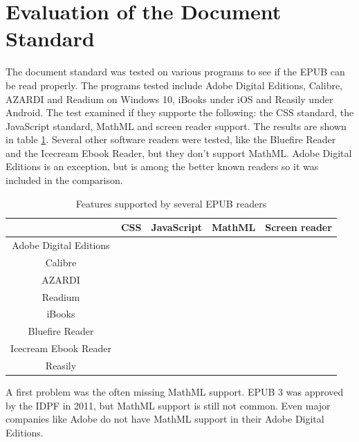 \documentclass[runningheads,a4paper]{llncs}
\newcommand{\cmark}{\ding{51}}%
\newcommand{\xmark}{\ding{55}}%
\begin{document}
\section{Evaluation of the Document Standard}
The document standard was tested on various programs to see if the EPUB can be read properly. The programs tested include Adobe Digital Editions, Calibre, AZARDI and Readium on Windows 10, iBooks under iOS and Reasily under Android. The test examined if they supporte the following: the CSS standard, the JavaScript standard, MathML and screen reader support. The results are shown in table \ref{fig:table}. Several other software readers were tested, like the Bluefire Reader and the Icecream Ebook Reader, but they don't support MathML. Adobe Digital Editions is an exception, but is among the better known readers so it was included in the comparison.
\begin{table}
	\centering
	\caption{Features supported by several EPUB readers}
             \begin{tabular}{| c | c | c | c | c |}
                           \hline
                           & CSS & JavaScript & MathML & Screen reader \\ \hline
                           Adobe Digital Editions & \xmark & \xmark & \xmark & \cmark \\ \hline
                           Calibre & \xmark & \cmark & \cmark & \xmark \\ \hline
                           AZARDI & \xmark & \xmark & \cmark & \cmark \\ \hline
                           Readium & \cmark & \xmark & \cmark & \cmark \\ \hline
                           iBooks & \xmark & \xmark & \cmark & \cmark \\ \hline
                           Bluefire Reader & \xmark & \xmark & \xmark & \xmark \\ \hline
                           Icecream Ebook Reader & \xmark & \xmark & \xmark & \xmark \\ \hline
                           Reasily & \cmark & \xmark & \cmark & \cmark \\ \hline
             \end{tabular}
\label{fig:table}
\end{table}
A first problem was the often missing MathML support. EPUB 3 was approved by the IDPF in 2011, but MathML support is still not common. Even major companies like Adobe do not have MathML support in their Adobe Digital Editions. 
\end{document}

